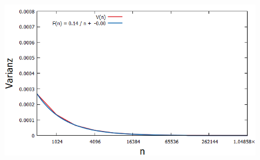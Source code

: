 \begin{figure}[H]
    \hspace*{-1cm}
    \begin{minipage}[t]{.30\textwidth}
        \centering
    \end{minipage}
    \hspace*{0.5cm}
    \begin{minipage}[t]{.30\textwidth}
        \centering
        \includegraphics[width=1.2\textwidth]{pictures/min_filter_fit_V4_n.png}
    \end{minipage}  
    \hspace*{0.8cm}
    \begin{minipage}[t]{.30\textwidth}
        \centering

\end{minipage}
\end{figure}
